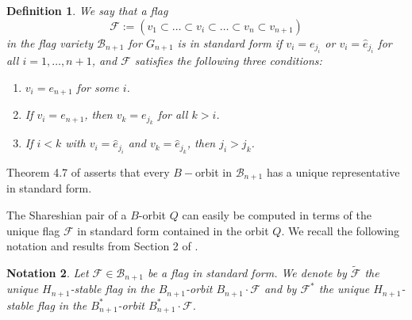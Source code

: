 \documentclass[12pt]{amsart}
\numberwithin{equation}{section}
\newtheorem{thm}{Theorem}[section]
\newtheorem{nota}[thm]{Notation}
\newtheorem{dfn}[thm]{Definition}
\newcommand{\B}{\mathcal{B}}
\newcommand{\he}{\hat{e}}
\newcommand{\F}{\mathcal{F}}
\begin{document}
\begin{dfn}\label{d:std}
We say that a flag 
\begin{equation}\label{eq:basicflag}
\mathcal{F}:=(v_{1}\subset \dots \subset v_{i}\subset\dots\subset v_{n} \subset v_{n+1})
\end{equation}
in the flag variety $\B_{n+1}$ for $G_{n+1}$
is in \emph{standard form} if $v_{i}=e_{j_{i}}$ or $v_{i}=\he_{j_{i}}$ for all $i=1,\dots, n+1$, and 
$\mathcal{F}$ satisfies the following three conditions:
\begin{enumerate}
\item $v_i = e_{n+1}$ for some $i$.
\item If $v_{i}=e_{n+1}$, then $v_{k}=e_{j_{k}}$ for all $k>i$.
 \item If $i<k$ with $v_{i}=\he_{j_{i}}$ and $v_{k}=\he_{j_{k}}$, then $j_{i}>j_{k}$. 
\end{enumerate}
\end{dfn}
Theorem 4.7 of \cite{CE21II} asserts that every $B-$orbit in $\B_{n+1}$ has a unique representative in standard form.
 
The Shareshian pair of a $B$-orbit $Q$ can easily be computed in terms of the unique flag $\F$ in standard form contained in the orbit $Q$.  We recall the following notation and results from Section 2 of \cite{Shpairs}. 
\begin{nota}\label{n:tildeandstarflags}
Let $\F\in\B_{n+1}$ be a flag in standard form.  We denote by $\tilde{\F}$ the unique $H_{n+1}$-stable flag in the $B_{n+1}$-orbit $B_{n+1}\cdot \F$ and
by $\F^{*}$ the unique $H_{n+1}$-stable flag in the $B_{n+1}^{*}$-orbit $B_{n+1}^{*}\cdot \F$.
\end{nota}
\end{document}
